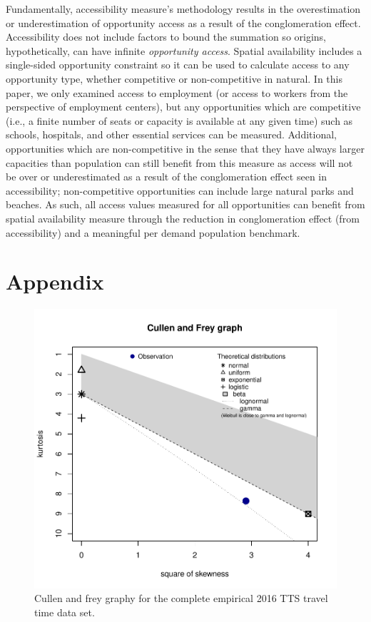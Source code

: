 \documentclass[]{elsarticle} %
\begin{document}
Fundamentally, accessibility measure's methodology results in the
overestimation or underestimation of opportunity access as a result of
the conglomeration effect. Accessibility does not include factors to
bound the summation so origins, hypothetically, can have infinite
\emph{opportunity access}. Spatial availability includes a single-sided
opportunity constraint so it can be used to calculate access to any
opportunity type, whether competitive or non-competitive in natural. In
this paper, we only examined access to employment (or access to workers
from the perspective of employment centers), but any opportunities which
are competitive (i.e., a finite number of seats or capacity is available
at any given time) such as schools, hospitals, and other essential
services can be measured. Additional, opportunities which are
non-competitive in the sense that they have always larger capacities
than population can still benefit from this measure as access will not
be over or underestimated as a result of the conglomeration effect seen
in accessibility; non-competitive opportunities can include large
natural parks and beaches. As such, all access values measured for all
opportunities can benefit from spatial availability measure through the
reduction in conglomeration effect (from accessibility) and a meaningful
per demand population benchmark.

\hypertarget{appendix}{%
\section{Appendix}\label{appendix}}

\begin{figure}
\includegraphics[width=1\linewidth]{Spatial-Availability_files/figure-latex/plot-cullen-frey-1} \caption{\label{fig:plot-cullen-frey}Cullen and frey graphy for the complete empirical 2016 TTS travel time data set.}\label{fig:plot-cullen-frey}
\end{figure}
\end{document}
